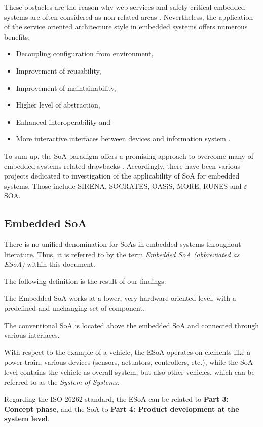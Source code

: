These obstacles are the reason why web services and safety-critical embedded systems are often considered as non-related areas \cite{rodrigues2011}. Nevertheless, the application of the service oriented architecture style in embedded systems offers numerous benefits: 
\begin{itemize}
\item Decoupling configuration from environment, 
\item Improvement of reusability,
\item Improvement of maintainability,
\item Higher level of abstraction,
\item Enhanced interoperability and
\item More interactive interfaces between devices and information system \cite{buckl}.
\end{itemize}

To sum up, the SoA paradigm offers a promising approach to overcome many of embedded systems related drawbacks \cite{buckl} \cite{sommer}. Accordingly, there have been various projects dedicated to investigation of the applicability of SoA for embedded systems. Those include SIRENA, SOCRATES, OASiS, MORE, RUNES and $\varepsilon$SOA. 



\subsection{Embedded SoA}
There is no unified denomination for SoAs in embedded systems throughout literature. Thus, it is referred to by the term \emph{Embedded SoA (abbreviated as ESoA)} within this document.

The following definition is the result of our findings:
\begin{myquote}
The Embedded SoA works at a lower, very hardware oriented level, with a predefined and unchanging set of component.

The conventional SoA is located above the embedded SoA and connected through various interfaces.
\end{myquote}

With respect to the example of a vehicle, the ESoA operates on elements like a power-train, various devices (sensors, actuators, controllers, etc.), while the SoA level contains the vehicle as overall system, but also other vehicles, which can be referred to as the \emph{System of Systems}.

Regarding the ISO 26262 standard, the ESoA can be related to \textbf{Part 3: Concept phase}, and the SoA to \textbf{Part 4: Product development at the system level}.



